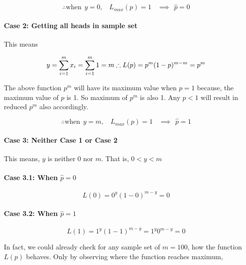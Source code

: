 \documentclass[float=false,crop=false]{standalone}
\begin{document}
\[
\therefore \text{when} \ \ y = 0, \ \ \ \ L_{max}(p) = 1 \ \ \ \ \implies \ \ \hat{p} = 0  
\]

\paragraph{Case 2: Getting all heads in sample
set}\label{case-2-getting-all-heads-in-sample-set}

This means

\[
y = \sum\limits_{i=1}^{m}x_i = \sum\limits_{i=1}^{m}1 = m \\
\therefore L(p) = p^{m}(1-p)^{m-m} = p^m
\]

The above function \(p^m\) will have its maximum value when \(p=1\)
because, the maximum value of \(p\) is 1. So maximum of \(p^m\) is also
1. Any \(p < 1\) will result in reduced \(p^m\) also accordingly.

\[
\therefore \text{when} \ \ y = m, \ \ \ \ L_{max}(p) = 1 \ \ \ \ \implies \ \ \hat{p} = 1  
\]

\paragraph{Case 3: Neither Case 1 or Case
2}\label{case-3-neither-case-1-or-case-2}

This means, \(y\) is neither \(0\) nor \(m\). That is, \(0 < y < m\)

\paragraph{\texorpdfstring{Case 3.1: When
\(\hat{p} = 0\)}{Case 3.1: When \textbackslash{}hat\{p\} = 0}}\label{case-3.1-when-hatp-0}

\[
L(0) = 0^y(1-0)^{m-y} = 0
\]

\paragraph{\texorpdfstring{Case 3.2: When
\(\hat{p} = 1\)}{Case 3.2: When \textbackslash{}hat\{p\} = 1}}\label{case-3.2-when-hatp-1}

\[
L(1) = 1^y(1-1)^{m-y} = 1^y0^{m-y} = 0
\]

    In fact, we could already check for any sample set of \(m=100\), how the
function \(L(p)\) behaves. Only by observing where the function reaches
maximum,
\end{document}
